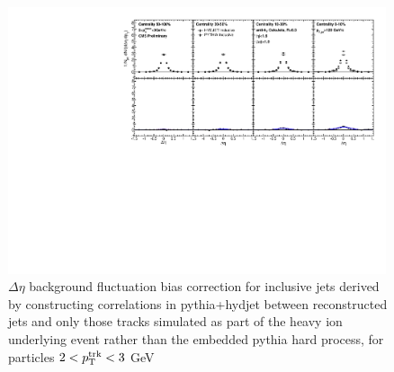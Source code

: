    \begin{figure}[hbtp]
              \begin{center}\includegraphics[width=0.99\textwidth]{figures/JFF_SpillOver/AN_Closures_Eta_InclusiveTrkPt2_TrkPt3.pdf}
             \caption[Background fluctuation bias corrections for particles with $2<p_{\rm T}^{\rm trk}<3$ GeV]{$\Delta\eta$ background fluctuation bias correction for inclusive jets derived by constructing correlations in {\sc pythia+hydjet} between reconstructed jets and only those tracks simulated as part of the heavy ion underlying event rather than the embedded {\sc pythia} hard process, for particles $2<p_{\rm T}^{\rm trk}<3$ GeV}
                \label{fig:reco_reco_closure_inc2}
                \end{center}
                \end{figure}

